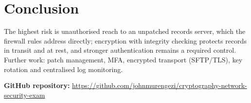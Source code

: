 \documentclass[11pt,a4paper]{article}
\begin{document}
\section{Conclusion}
The highest risk is unauthorised reach to an unpatched records server, which the firewall rules address directly; encryption with integrity checking protects records in transit and at rest, and stronger authentication remains a required control. Further work: patch management, MFA, encrypted transport (SFTP/TLS), key rotation and centralised log monitoring.

\vspace{1em}
\noindent\textbf{GitHub repository:} \url{https://github.com/johnmurengezi/cryptography-network-security-exam}
\end{document}
